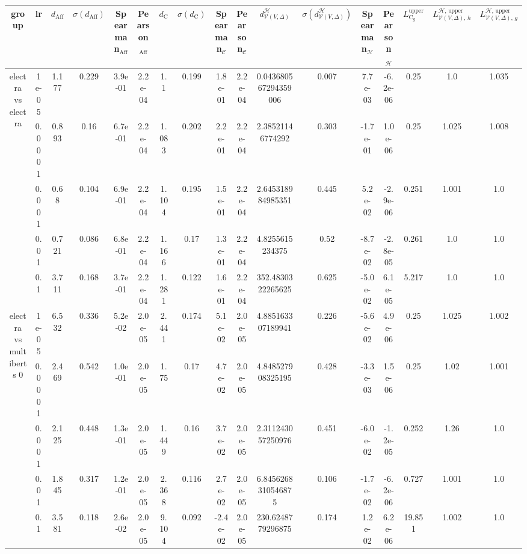 \begin{tabular}{|c|c|c|c|c|c|c|c|c|c|c|c|c|c|c|c|c|}
\hline
group & lr & $d_{\mathrm{Aff}}$ & $\sigma(d_{\mathrm{Aff}})$ & Spearman$_{\mathrm{Aff}}$ & Pearson$_{\mathrm{Aff}}$ & $d_{\mathrm{C}}$ & $\sigma(d_{\mathrm{C}})$ & Spearman$_{\mathcal{C}}$ & Pearson$_{\mathcal{C}}$ & $d^\mathcal{H}_{\mathcal{V}(V,\Delta)}$ & $\sigma(d^\mathcal{H}_{\mathcal{V}(V,\Delta)})$ & Spearman$_{\mathcal{H}}$ & Pearson$_{\mathcal{H}}$ & $L_{\mathrm{C}_g}^{\mathrm{upper}}$ & $L^{\mathcal{H},\,\mathrm{upper}}_{\mathcal{V}(V,\Delta),\,h}$ & $L^{\mathcal{H},\,\mathrm{upper}}_{\mathcal{V}(V,\Delta),\,g}$ \\
\hline
\multirow{5}{*}{electra  vs electra } & 1e-05 & 1.177 & 0.229 & 3.9e-01 & 2.2e-04 & 1.1 & 0.199 & 1.8e-01 & 2.2e-04 & 0.043680567294359006 & 0.007 & 7.7e-03 & -6.2e-06 & 0.25 & 1.0 & 1.035 \\
 & 0.0001 & 0.893 & 0.16 & 6.7e-01 & 2.2e-04 & 1.083 & 0.202 & 2.2e-01 & 2.2e-04 & 2.38521146774292 & 0.303 & -1.7e-01 & 1.0e-06 & 0.25 & 1.025 & 1.008 \\
 & 0.001 & 0.68 & 0.104 & 6.9e-01 & 2.2e-04 & 1.104 & 0.195 & 1.5e-01 & 2.2e-04 & 2.645318984985351 & 0.445 & 5.2e-02 & -2.9e-06 & 0.251 & 1.001 & 1.0 \\
 & 0.01 & 0.721 & 0.086 & 6.8e-01 & 2.2e-04 & 1.166 & 0.17 & 1.3e-01 & 2.2e-04 & 4.8255615234375 & 0.52 & -8.7e-02 & -2.8e-05 & 0.261 & 1.0 & 1.0 \\
 & 0.1 & 3.711 & 0.168 & 3.7e-01 & 2.2e-04 & 1.281 & 0.122 & 1.6e-01 & 2.2e-04 & 352.4830322265625 & 0.625 & -5.0e-02 & 6.1e-05 & 5.217 & 1.0 & 1.0 \\
\hline
\multirow{5}{*}{electra  vs multiberts 0} & 1e-05 & 6.532 & 0.336 & 5.2e-02 & 2.0e-05 & 2.441 & 0.174 & 5.1e-02 & 2.0e-05 & 4.885163307189941 & 0.226 & -5.6e-02 & 4.9e-06 & 0.25 & 1.025 & 1.002 \\
 & 0.0001 & 2.469 & 0.542 & 1.0e-01 & 2.0e-05 & 1.75 & 0.17 & 4.7e-02 & 2.0e-05 & 4.848527908325195 & 0.428 & -3.3e-03 & 1.5e-06 & 0.25 & 1.02 & 1.001 \\
 & 0.001 & 2.125 & 0.448 & 1.3e-01 & 2.0e-05 & 1.449 & 0.16 & 3.7e-02 & 2.0e-05 & 2.311243057250976 & 0.451 & -6.0e-02 & -1.2e-05 & 0.252 & 1.26 & 1.0 \\
 & 0.01 & 1.845 & 0.317 & 1.2e-01 & 2.0e-05 & 2.368 & 0.116 & 2.7e-02 & 2.0e-05 & 6.8456268310546875 & 0.106 & -1.7e-02 & -6.2e-06 & 0.727 & 1.001 & 1.0 \\
 & 0.1 & 3.581 & 0.118 & 2.6e-02 & 2.0e-05 & 9.104 & 0.092 & -2.4e-02 & 2.0e-05 & 230.6248779296875 & 0.174 & 1.2e-02 & 6.2e-06 & 19.851 & 1.002 & 1.0 \\

\end{tabular}
